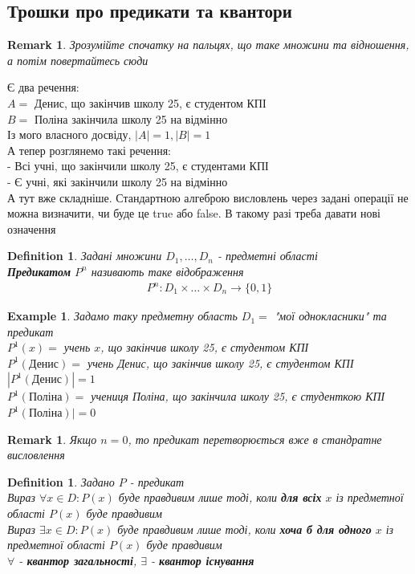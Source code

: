 \documentclass[a4paper, 14pt]{extarticle}
\theoremstyle{theoremdd}
\theoremstyle{theoremdd}
\newtheorem{definition}[theorem]{Definition}
\theoremstyle{theoremdd}
\theoremstyle{theoremdd}
\newtheorem{example}[theorem]{Example}
\theoremstyle{theoremdd}
\theoremstyle{theoremdd}
\newtheorem{remark}[theorem]{Remark}
\theoremstyle{theoremdd}
\theoremstyle{theoremdd}
\begin{document}
\subsection{Трошки про предикати та квантори}
\begin{remark}
Зрозумійте спочатку на пальцях, що таке множини та відношення, а потім повертайтесь сюди
\end{remark}
Є два речення: \\
$A =$ Денис, що закінчив школу 25, є студентом КПІ\\
$B =$ Поліна закінчила школу 25 на відмінно\\
Із мого власного досвіду, $|A| = 1, |B| = 1$
\bigskip \\
А тепер розглянемо такі речення: \\
- Всі учні, що закінчили школу 25, є студентами КПІ\\
- Є учні, які закінчили школу 25 на відмінно\\
А тут вже складніше. Стандартною алгеброю висловлень через задані операції не можна визначити, чи буде це true або false. В такому разі треба давати нові означення
\begin{definition}
Задані множини $D_1,\dots,D_n$ - предметні області\\
\textbf{Предикатом} $P^n$ називають таке відображення
\begin{align*}
P^n: D_1 \times \dots \times D_n \to \{0,1\}
\end{align*}
\end{definition}

\begin{example}
Задамо таку предметну область $D_1 = $ "мої однокласники" та предикат\\
$P^1(x) = $ учень $x$, що закінчив школу 25, є студентом КПІ\\
$P^1(\text{Денис}) =$ учень Денис, що закінчив школу 25, є студентом КПІ \\ $|P^1(\text{Денис})| = 1$\\
$P^1(\text{Поліна}) =$ учениця Поліна, що закінчила школу 25, є студенткою КПІ \\ $P^1(\text{Поліна})| = 0$\\
\end{example}

\begin{remark}
Якщо $n=0$, то предикат перетворюється вже в стандратне висловлення
\end{remark}

\begin{definition}
Задано $P$ - предикат\\
Вираз $\forall x \in D: P(x)$ буде правдивим лише тоді, коли \textbf{для всіх} $x$ із предметної області $P(x)$ буде правдивим\\
Вираз $\exists x \in D: P(x)$ буде правдивим лише тоді, коли \textbf{хоча б для одного} $x$ із предметної області $P(x)$ буде правдивим\\
$\forall$ - \textbf{квантор загальності}, $\exists$ - \textbf{квантор існування}
\end{definition}
\end{document}
